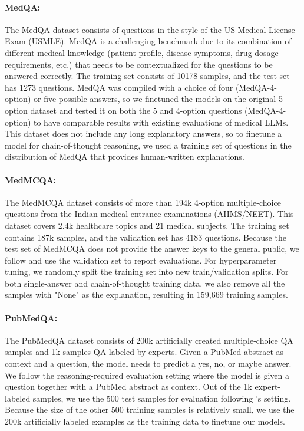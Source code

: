 \documentclass{article}
\begin{document}
\paragraph{MedQA:} 
The MedQA \citep{medqa} dataset consists of questions in the style of the US Medical License Exam (USMLE). MedQA is a challenging benchmark due to its combination of different medical knowledge (patient profile, disease symptoms, drug dosage requirements, etc.) that needs to be contextualized for the questions to be answered correctly. The training set consists of 10178 samples, and the test set has 1273 questions. MedQA was compiled with a choice of four (MedQA-4-option) or five possible answers, so we finetuned the models on the original 5-option dataset and tested it on both the 5 and 4-option questions (MedQA-4-option) to have comparable results with existing evaluations of medical LLMs. This dataset does not include any long explanatory answers, so to finetune a model for chain-of-thought reasoning, we used a training set of questions in the distribution of MedQA that provides human-written explanations.

\vspace{-2mm}
\paragraph{MedMCQA:} 
The MedMCQA \citep{medmcqa} dataset consists of more than 194k 4-option multiple-choice questions from the Indian medical entrance examinations (AIIMS/NEET). This dataset covers 2.4k healthcare topics and 21 medical subjects. The training set contains 187k samples, and the validation set has 4183 questions. Because the test set of MedMCQA does not provide the answer keys to the general public, we follow \citet{wu2023pmcllama} and use the validation set to report evaluations. For hyperparameter tuning, we randomly split the training set into new train/validation splits. For both single-answer and chain-of-thought training data, we also remove all the samples with "None" as the explanation, resulting in 159,669 training samples.


\paragraph{PubMedQA:}
The PubMedQA \citep{jin-etal-2019-pubmedqa} dataset consists of 200k artificially created multiple-choice QA samples and 1k samples QA labeled by experts. Given a PubMed abstract as context and a question, the model needs to predict a yes, no, or maybe answer. We follow the reasoning-required evaluation setting where the model is given a question together with a PubMed abstract as context. Out of the 1k expert-labeled samples, we use the 500 test samples for evaluation following \citet{medpalm}'s setting. Because the size of the other 500 training samples is relatively small, we use the 200k artificially labeled examples as the training data to finetune our models.
\end{document}
